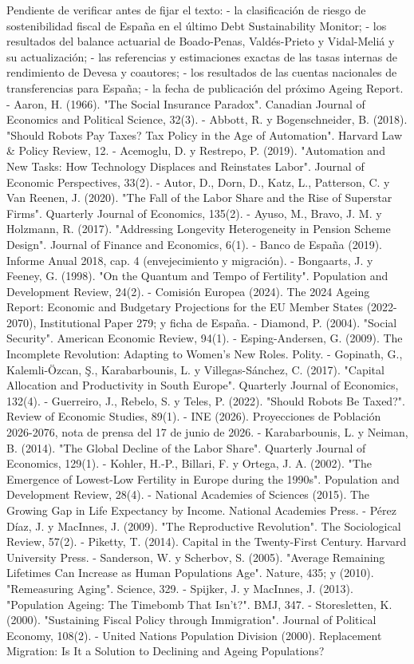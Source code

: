 \documentclass[10pt,a4paper]{article}
\begin{document}
Pendiente de verificar antes de fijar el texto:
- la clasificación de riesgo de sostenibilidad fiscal de España en el último Debt Sustainability Monitor;
- los resultados del balance actuarial de Boado-Penas, Valdés-Prieto y Vidal-Meliá y su actualización;
- las referencias y estimaciones exactas de las tasas internas de rendimiento de Devesa y coautores;
- los resultados de las cuentas nacionales de transferencias para España;
- la fecha de publicación del próximo Ageing Report.
- Aaron, H. (1966). "The Social Insurance Paradox". Canadian Journal of Economics and Political Science, 32(3).
- Abbott, R. y Bogenschneider, B. (2018). "Should Robots Pay Taxes? Tax Policy in the Age of Automation". Harvard Law & Policy Review, 12.
- Acemoglu, D. y Restrepo, P. (2019). "Automation and New Tasks: How Technology Displaces and Reinstates Labor". Journal of Economic Perspectives, 33(2).
- Autor, D., Dorn, D., Katz, L., Patterson, C. y Van Reenen, J. (2020). "The Fall of the Labor Share and the Rise of Superstar Firms". Quarterly Journal of Economics, 135(2).
- Ayuso, M., Bravo, J. M. y Holzmann, R. (2017). "Addressing Longevity Heterogeneity in Pension Scheme Design". Journal of Finance and Economics, 6(1).
- Banco de España (2019). Informe Anual 2018, cap. 4 (envejecimiento y migración).
- Bongaarts, J. y Feeney, G. (1998). "On the Quantum and Tempo of Fertility". Population and Development Review, 24(2).
- Comisión Europea (2024). The 2024 Ageing Report: Economic and Budgetary Projections for the EU Member States (2022-2070), Institutional Paper 279; y ficha de España.
- Diamond, P. (2004). "Social Security". American Economic Review, 94(1).
- Esping-Andersen, G. (2009). The Incomplete Revolution: Adapting to Women's New Roles. Polity.
- Gopinath, G., Kalemli-Özcan, Ş., Karabarbounis, L. y Villegas-Sánchez, C. (2017). "Capital Allocation and Productivity in South Europe". Quarterly Journal of Economics, 132(4).
- Guerreiro, J., Rebelo, S. y Teles, P. (2022). "Should Robots Be Taxed?". Review of Economic Studies, 89(1).
- INE (2026). Proyecciones de Población 2026-2076, nota de prensa del 17 de junio de 2026.
- Karabarbounis, L. y Neiman, B. (2014). "The Global Decline of the Labor Share". Quarterly Journal of Economics, 129(1).
- Kohler, H.-P., Billari, F. y Ortega, J. A. (2002). "The Emergence of Lowest-Low Fertility in Europe during the 1990s". Population and Development Review, 28(4).
- National Academies of Sciences (2015). The Growing Gap in Life Expectancy by Income. National Academies Press.
- Pérez Díaz, J. y MacInnes, J. (2009). "The Reproductive Revolution". The Sociological Review, 57(2).
- Piketty, T. (2014). Capital in the Twenty-First Century. Harvard University Press.
- Sanderson, W. y Scherbov, S. (2005). "Average Remaining Lifetimes Can Increase as Human Populations Age". Nature, 435; y (2010). "Remeasuring Aging". Science, 329.
- Spijker, J. y MacInnes, J. (2013). "Population Ageing: The Timebomb That Isn't?". BMJ, 347.
- Storesletten, K. (2000). "Sustaining Fiscal Policy through Immigration". Journal of Political Economy, 108(2).
- United Nations Population Division (2000). Replacement Migration: Is It a Solution to Declining and Ageing Populations?
\end{document}

